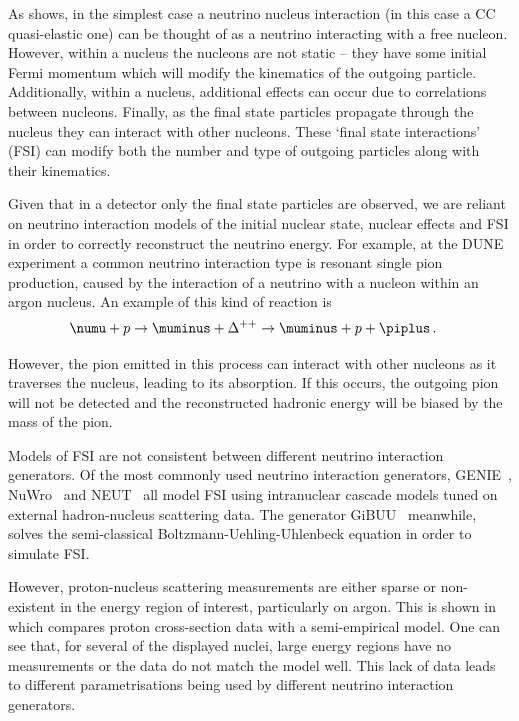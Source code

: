 As  shows, in the simplest case a neutrino nucleus interaction (in this case a CC quasi-elastic one) can be thought of as a neutrino interacting with a free nucleon.
However, within a nucleus the nucleons are not static -- they have some initial Fermi momentum which will modify the kinematics of the outgoing particle.
Additionally, within a nucleus, additional effects can occur due to correlations between nucleons.
Finally, as the final state particles propagate through the nucleus they can interact with other nucleons.
These `final state interactions' (FSI) can modify both the number and type of outgoing particles along with their kinematics.

Given that in a detector only the final state particles are observed, we are reliant on neutrino interaction models of the initial nuclear state, nuclear effects and FSI in order to correctly reconstruct the neutrino energy.
For example, at the DUNE experiment a common neutrino interaction type is resonant single pion production, caused by the interaction of a neutrino with a nucleon within an argon nucleus.
An example of this kind of reaction is 
\begin{align}
  \numu + p &\rightarrow \muminus + \Delta^{++} \rightarrow \muminus + p + \piplus \, .
 \end{align}

However, the pion emitted in this process can interact with other nucleons as it traverses the nucleus, leading to its absorption.
If this occurs, the outgoing pion will not be detected and the reconstructed hadronic energy will be biased by the mass of the pion.

Models of FSI are not consistent between different neutrino interaction generators.
Of the most commonly used neutrino interaction generators, GENIE~\cite{genie}, NuWro~\cite{nuwro} and NEUT~\cite{neut} all model FSI using intranuclear cascade models tuned on external hadron-nucleus scattering data.
The generator GiBUU~\cite{gibuu} meanwhile, solves the semi-classical Boltzmann-Uehling-Uhlenbeck equation in order to simulate FSI.

However, proton-nucleus scattering measurements are either sparse or non-existent in the energy region of interest, particularly on argon.
This is shown in  which compares proton cross-section data with a semi-empirical model.
One can see that, for several of the displayed nuclei, large energy regions have no measurements or the data do not match the model well.
This lack of data leads to different parametrisations being used by different neutrino interaction generators.

